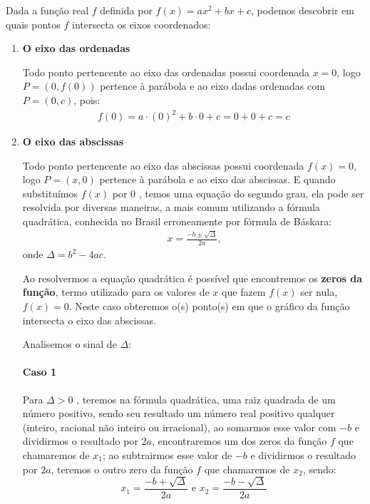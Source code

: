 Dada a função real \(f\) definida por \(f(x)=ax^2+bx+c\), podemos descobrir em quais pontos \(f\) intersecta os eixos coordenados:
\begin{enumerate}
\item {} 
\textbf{O eixo das ordenadas}

Todo ponto pertencente ao eixo das ordenadas possui coordenada \(x=0\), logo \(P=(0,f(0))\) pertence à parábola e ao eixo dadas ordenadas com \(P=(0,c)\), pois:
\begin{equation*}
\begin{split}f(0)=a\cdot(0)^2+b\cdot0 + c = 0 + 0 + c = c\end{split}
\end{equation*}
\item {} 
\textbf{O eixo das abscissas}

Todo ponto pertencente ao eixo das abscissas possui coordenada \(f(x)=0\), logo \(P=(x,0)\) pertence à parábola e ao eixo das abscissas. E quando substituímos \(f(x)\) por \(0\) , temos uma equação do segundo grau, ela pode ser resolvida por diversas maneiras, a mais comum utilizando a fórmula quadrática, conhecida no Brasil erroneamente por fórmula de Báskara:
\begin{equation*}
\begin{split}x=\frac{-b\pm\sqrt{\Delta}}{2a} \text{,}\end{split}
\end{equation*}
onde \(\Delta=b^2-4ac\).

Ao resolvermos a equação quadrática é possível que encontremos os \textbf{zeros da função}, termo utilizado para os valores de \(x\) que fazem \(f(x)\) ser nula, \(f(x)=0\). Neste caso obteremos o(s) ponto(s) em que o gráfico da função intersecta o eixo das abscissas.

Analisemos o sinal de \(\Delta\):

\paragraph{Caso 1}

Para \(\Delta>0\) , teremos na fórmula quadrática, uma raiz quadrada de um número positivo, sendo seu resultado um número real positivo qualquer (inteiro, racional não inteiro ou irracional), ao somarmos esse valor com \(-b\) e dividirmos o resultado por \(2a\),  encontraremos um dos zeros da função \(f\) que chamaremos de \(x_1\); ao subtrairmos esse valor de \(-b\) e dividirmos o resultado por \(2a\), teremos o outro zero da função \(f\) que chamaremos de \(x_2\), sendo: $$x_1= \frac{-b+\sqrt{\Delta}}{2a} \text{ e } x_2=\frac{-b-\sqrt{\Delta}}{2a}$$


\end{enumerate}

